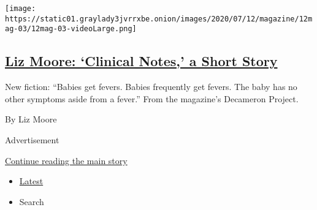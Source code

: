 \begin{enumerate}
  \texttt{[image: https://static01.graylady3jvrrxbe.onion/images/2020/07/12/magazine/12mag-03/12mag-03-videoLarge.png]}

  \hypertarget{liz-moore-clinical-notes-a-short-story}{%
  \subsection{\texorpdfstring{\href{/interactive/2020/07/07/magazine/liz-moore-short-story.html}{Liz
  Moore: `Clinical Notes,' a Short
  Story}}{Liz Moore: `Clinical Notes,' a Short Story}}\label{liz-moore-clinical-notes-a-short-story}}

  New fiction: ``Babies get fevers. Babies frequently get fevers. The
  baby has no other symptoms aside from a fever.'' From the magazine's
  Decameron Project.

  By Liz Moore
\end{enumerate}

Advertisement

\protect\hyperlink{after-mid1}{Continue reading the main story}

\begin{itemize}
\tightlist
\item
  \protect\hyperlink{stream-panel}{Latest}
\item
  Search
\end{itemize}

